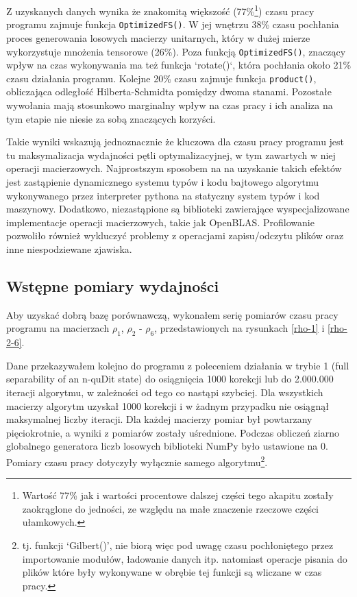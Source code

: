 \documentclass[11pt, a4paper]{article}
\newcommand{\code}[1]{\texttt{#1}}
\begin{document}
\begin{sloppypar}
    Z uzyskanych danych wynika że znakomitą większość (77\%\footnote{Wartość 77\% jak i
    wartości procentowe dalszej części tego akapitu zostały zaokrąglone do jedności, ze względu
    na małe znaczenie rzeczowe części ułamkowych.}) czasu pracy programu zajmuje funkcja
    \code{OptimizedFS()}. W jej wnętrzu 38\% czasu pochłania proces generowania losowych
    macierzy unitarnych, który w dużej mierze wykorzystuje mnożenia tensorowe (26\%).
    Poza funkcją \code{OptimizedFS()}, znaczący wpływ na czas wykonywania ma też funkcja
    `rotate()`, która pochłania około 21\% czasu działania programu. Kolejne 20\% czasu
    zajmuje funkcja \code{product()}, obliczająca odległość Hilberta-Schmidta pomiędzy
    dwoma stanami. Pozostałe wywołania mają stosunkowo marginalny wpływ na czas pracy i ich
    analiza na tym etapie nie niesie za sobą znaczących korzyści.

    Takie wyniki wskazują jednoznacznie że kluczowa dla czasu pracy programu jest tu maksymalizacja
    wydajności pętli optymalizacyjnej, w tym zawartych w niej operacji macierzowych. Najprostszym
    sposobem na na uzyskanie takich efektów jest zastąpienie dynamicznego systemu typów i
    kodu bajtowego algorytmu wykonywanego przez interpreter pythona na statyczny system typów
    i kod maszynowy. Dodatkowo, niezastąpione są biblioteki zawierające wyspecjalizowane
    implementacje operacji macierzowych, takie jak OpenBLAS. Profilowanie pozwoliło również
    wykluczyć problemy z operacjami zapisu/odczytu plików oraz inne niespodziewane zjawiska.

    \subsection{Wstępne pomiary wydajności}
    Aby uzyskać dobrą bazę porównawczą, wykonałem serię pomiarów czasu pracy programu na
    macierzach $\rho_{1}$, $\rho_{2}$ - $\rho_{6}$, przedstawionych na rysunkach
    \ref{rho-1} i \ref{rho-2-6}.

    Dane przekazywałem kolejno do programu z poleceniem działania w trybie 1 (full separability
    of an n-quDit state) do osiągnięcia 1000 korekcji lub do 2.000.000 iteracji algorytmu,
    w zależności od tego co nastąpi szybciej. Dla wszystkich macierzy algorytm uzyskał 1000
    korekcji i w żadnym przypadku nie osiągnął maksymalnej liczby iteracji. Dla każdej
    macierzy pomiar był powtarzany pięciokrotnie, a wyniki z pomiarów zostały uśrednione.
    Podczas obliczeń ziarno globalnego generatora liczb losowych biblioteki NumPy było
    ustawione na 0. Pomiary czasu pracy dotyczyły wyłącznie samego algorytmu\footnote{tj.
    funkcji `Gilbert()', nie biorą więc pod uwagę czasu pochłoniętego przez importowanie
    modułów, ładowanie danych itp. natomiast operacje pisania do plików które były wykonywane
    w obrębie tej funkcji są wliczane w czas pracy.}.


\end{sloppypar}
\end{document}
